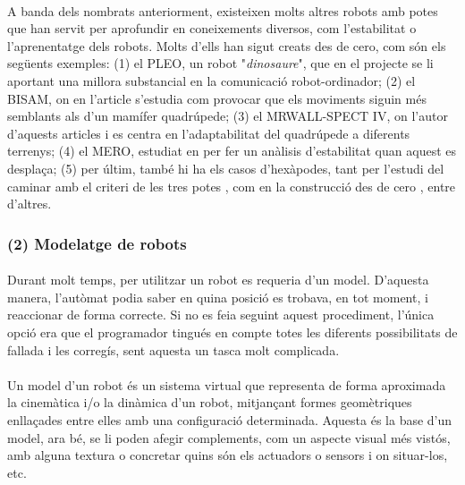 \documentclass[12pt,a4paper,final,twoside]{article}
\begin{document}
\paragraph{}A banda dels nombrats anteriorment, existeixen molts altres robots amb potes que han servit per aprofundir en coneixements diversos, com l'estabilitat o l'aprenentatge dels robots. Molts d'ells han sigut creats des de cero, com són els següents exemples: (1) el PLEO, un robot "\textit{dinosaure}", que en el projecte \cite{Menendez2011} se li aportant una millora substancial en la comunicació robot-ordinador; (2) el BISAM, on en l'article \cite{Albiez2003} s'estudia com provocar que els moviments siguin més semblants als d'un mamífer quadrúpede; (3) el MRWALL-SPECT IV, on l'autor d'aquests articles \cite{Loc2010} i \cite{Loc2011} es centra en l'adaptabilitat del quadrúpede a diferents terrenys; (4) el MERO, estudiat en \cite{Ion} per fer un anàlisis d'estabilitat quan aquest es desplaça; (5) per últim, també hi ha els casos d'hexàpodes, tant per l'estudi del caminar amb el criteri de les tres potes \cite{Lee1988}, com en la construcció des de cero \cite{Lojo2009}, entre d'altres. 

\label{Modelatge de robots}
\subsubsection*{(2) Modelatge de robots}

\paragraph{}Durant molt temps, per utilitzar un robot es requeria d'un model. D'aquesta manera, l'autòmat podia saber en quina posició es trobava, en tot moment, i reaccionar de forma correcte. Si no es feia seguint aquest procediment, l'única opció era que el programador tingués en compte totes les diferents possibilitats de fallada i les corregís, sent aquesta un tasca molt complicada.  

\paragraph{}Un model d'un robot és un sistema virtual que representa de forma aproximada la cinemàtica i/o la dinàmica d'un robot, mitjançant formes geomètriques enllaçades entre elles amb una configuració determinada. Aquesta és la base d'un model, ara bé, se li poden afegir complements, com un aspecte visual més vistós, amb alguna textura o concretar quins són els actuadors o sensors i on situar-los, etc.
\end{document}
